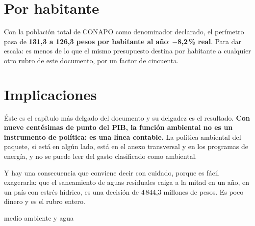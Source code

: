 \section{Por habitante}

Con la población total de CONAPO como denominador declarado, el perímetro pasa de
\textbf{131,3 a 126,3 pesos por habitante al año}: \textbf{$-$8,2\,\% real}. Para dar escala:
es menos de lo que el mismo presupuesto destina por habitante a cualquier otro rubro de este
documento, por un factor de cincuenta.

\section{Implicaciones}

Éste es el capítulo más delgado del documento y su delgadez es el resultado. \textbf{Con nueve
centésimas de punto del PIB, la función ambiental no es un instrumento de política: es una
línea contable.} La política ambiental del paquete, si está en algún lado, está en el anexo
transversal y en los programas de energía, y no se puede leer del gasto clasificado como
ambiental.

Y hay una consecuencia que conviene decir con cuidado, porque es fácil exagerarla: que el
saneamiento de aguas residuales caiga a la mitad en un año, en un país con estrés hídrico, es
una decisión de 4\,844,3 millones de pesos. Es poco dinero y es el rubro entero.

\begin{ficha}{medio ambiente y agua}
\end{ficha}
\clearpage
